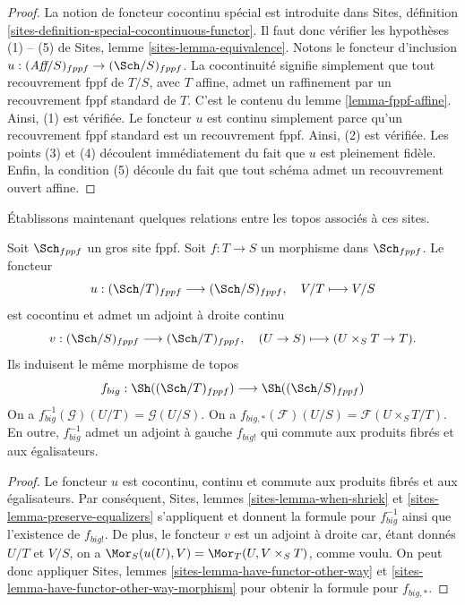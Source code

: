 \begin{proof}
La notion de foncteur cocontinu spécial est introduite dans
Sites, définition \ref{sites-definition-special-cocontinuous-functor}.
Il faut donc vérifier les hypothèses (1) -- (5) de
Sites, lemme \ref{sites-lemma-equivalence}.
Notons le foncteur d'inclusion
$u : (\textit{Aff}/S)_{fppf} \to (\Sch/S)_{fppf}$.
La cocontinuité signifie simplement que tout recouvrement fppf de
$T/S$, avec $T$ affine, admet un raffinement par un recouvrement fppf standard de $T$.
C'est le contenu du
lemme \ref{lemma-fppf-affine}.
Ainsi, (1) est vérifiée. Le foncteur $u$ est continu simplement parce qu'un recouvrement
fppf standard est un recouvrement fppf. Ainsi, (2) est vérifiée.
Les points (3) et (4) découlent immédiatement du fait que $u$ est
pleinement fidèle. Enfin, la condition (5) découle du
fait que tout schéma admet un recouvrement ouvert affine.
\end{proof}

\noindent
Établissons maintenant quelques relations entre les topos
associés à ces sites.

\begin{lemma}
\label{lemma-morphism-big-fppf}
Soit $\Sch_{fppf}$ un gros site fppf.
Soit $f : T \to S$ un morphisme dans $\Sch_{fppf}$.
Le foncteur
$$
u : (\Sch/T)_{fppf} \longrightarrow (\Sch/S)_{fppf},
\quad
V/T \longmapsto V/S
$$
est cocontinu et admet un adjoint à droite continu
$$
v : (\Sch/S)_{fppf} \longrightarrow (\Sch/T)_{fppf},
\quad
(U \to S) \longmapsto (U \times_S T \to T).
$$
Ils induisent le même morphisme de topos
$$
f_{big} :
\Sh((\Sch/T)_{fppf})
\longrightarrow
\Sh((\Sch/S)_{fppf})
$$
On a $f_{big}^{-1}(\mathcal{G})(U/T) = \mathcal{G}(U/S)$.
On a $f_{big, *}(\mathcal{F})(U/S) = \mathcal{F}(U \times_S T/T)$.
En outre, $f_{big}^{-1}$ admet un adjoint à gauche $f_{big!}$ qui commute aux
produits fibrés et aux égalisateurs.
\end{lemma}

\begin{proof}
Le foncteur $u$ est cocontinu, continu et commute aux produits fibrés
et aux égalisateurs. Par conséquent,
Sites, lemmes \ref{sites-lemma-when-shriek} et
\ref{sites-lemma-preserve-equalizers}
s'appliquent et donnent la formule
pour $f_{big}^{-1}$ ainsi que l'existence de $f_{big!}$. De plus,
le foncteur $v$ est un adjoint à droite car, étant donnés $U/T$ et $V/S$,
on a $\Mor_S(u(U), V) = \Mor_T(U, V \times_S T)$,
comme voulu. On peut donc appliquer
Sites, lemmes \ref{sites-lemma-have-functor-other-way} et
\ref{sites-lemma-have-functor-other-way-morphism} pour obtenir la
formule pour $f_{big, *}$.
\end{proof}

